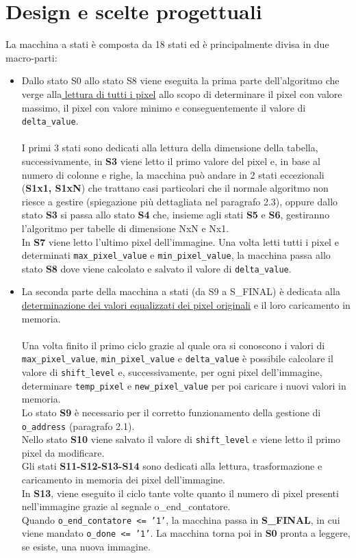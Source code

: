 \documentclass[12pt, table, xcdraw]{article}
\begin{document}
\section{Design e scelte progettuali}
La macchina a stati è composta da 18 stati ed è principalmente divisa in due macro-parti:
\begin{itemize}
\item Dallo stato S0 allo stato S8 viene eseguita la prima parte dell'algoritmo che verge alla\underline{ lettura di tutti i pixel} allo scopo di determinare il pixel con valore massimo, il pixel con valore minimo e conseguentemente il valore di \texttt{delta\_value}. \\ \\I primi 3 stati sono dedicati alla lettura della
dimensione della tabella, successivamente, in \textbf{S3} viene letto il primo valore del pixel e, in base al numero di colonne e righe, la macchina può andare in 2 stati eccezionali (\textbf{S1x1, S1xN}) che trattano casi particolari che il normale algoritmo non riesce a gestire (spiegazione più dettagliata nel paragrafo 2.3), oppure dallo stato \textbf{S3} si passa allo stato \textbf{S4} che, insieme agli stati \textbf{S5} e \textbf{S6}, gestiranno l'algoritmo per tabelle di dimensione 
NxN e Nx1.\\In \textbf{S7} viene letto l'ultimo pixel dell'immagine. Una volta letti tutti i pixel e determinati \texttt{max\_pixel\_value} e \texttt{min\_pixel\_value}, la macchina passa allo stato \textbf{S8} dove viene calcolato e salvato il valore di \texttt{delta\_value}.
\item La seconda parte della macchina a stati (da S9 a S\_FINAL) è dedicata alla \underline{determinazione dei valori equalizzati dei pixel originali} e il loro caricamento in memoria. \\ \\Una volta finito il primo ciclo grazie al quale ora si conoscono i valori di \texttt{max\_pixel\_value}, \texttt{min\_pixel\_value} e \texttt{delta\_value} è possibile calcolare il valore di \texttt{shift\_level} e, successivamente, per ogni pixel dell'immagine, determinare \texttt{temp\_pixel} e \texttt{new\_pixel\_value} per poi caricare i nuovi valori in memoria.\\ Lo stato \textbf{S9} è necessario per il corretto funzionamento della gestione di \texttt{o\_address} (paragrafo 2.1).\\ Nello stato \textbf{S10} viene salvato il valore di \texttt{shift\_level} e viene letto il primo pixel da modificare.\\ Gli stati \textbf{S11-S12-S13-S14} sono dedicati alla lettura, trasformazione e caricamento in memoria dei pixel dell'immagine. \\In \textbf{S13}, viene eseguito il ciclo tante volte quanto il numero di pixel presenti nell'immagine grazie al segnale o\_end\_contatore. \\Quando \texttt{o\_end\_contatore \textless= '1'}, la macchina passa in\textbf{ S\_FINAL}, in cui viene mandato \texttt{o\_done \textless= '1'}. La macchina torna poi in \textbf{S0} pronta a leggere, se esiste, una nuova immagine. 
\end{itemize}
\end{document}
